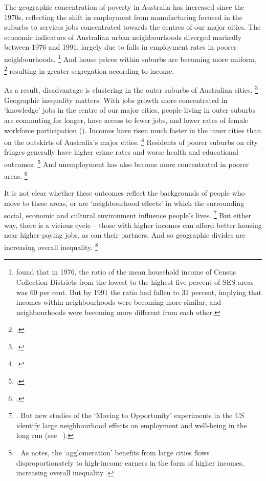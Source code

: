 The geographic concentration of poverty in Australia has increased since the 1970s, reflecting the shift in employment from manufacturing focused in the suburbs to services jobs concentrated towards the centres of our major cities.
The economic indicators of Australian urban neighbourhoods diverged markedly between 1976 and 1991, largely due to falls in employment rates in poorer neighbourhoods.%
    \footnote{\textcite{Gregory-Hunter-1995-spatial-disadvantage} found that in 1976, the ratio of the mean household income of Census Collection Districts from the lowest to the highest five percent of SES areas was 60 per cent.
    But by 1991 the ratio had fallen to 31 percent, implying that incomes within neighbourhoods were becoming more similar, and neighbourhoods were becoming more different from each other.}
And house prices within suburbs are becoming more uniform,%
	\footcite[][34, 18]{KellyHarrisonHunterEtAl2013}
resulting in greater segregation according to income.

As a result, disadvantage is clustering in the outer suburbs of Australian cities.%
	\footcites{Ryan-Selim-2017-theConvo-Liveable-Sydney-has-clear-winners-and-losers}{Pawson-et-al-2015-Addressing}{Hulse-etal-2014-AHURI-Disadv-places-urban-Aust-analyse-poverty-house-prices}
Geographic inequality matters.
With jobs growth more concentrated in `knowledge' jobs in the centre of our major cities, people living in outer suburbs are commuting for longer, have access to fewer jobs, and lower rates of female workforce participation ().
Incomes have risen much faster in the inner cities than on the outskirts of Australia's major cities.%
	\footcite[][9--11]{DaleyWoodChivers2017RegPatterns}
Residents of poorer suburbs on city fringes generally have higher crime rates and worse health and educational outcomes.%
	\footcites[][34]{KellyHarrisonHunterEtAl2013}{Katz-etal-2000-Boston-randomized-mobility-experiment}{Glaeser-2007-Econ-Approach-to-cities}
And unemployment has also become more concentrated in poorer areas.%
	\footcites{Pawson-et-al-2015-Addressing}[][17]{DaleyWood2015FiscalChallenges}

It is not clear whether these outcomes reflect the backgrounds of people who move to these areas, or are `neighbourhood effects' in which the surrounding social, economic and cultural environment influence people's lives.%
	\footnote{\textcite[][34]{KellyHarrisonHunterEtAl2013}. But new studies of the `Moving to Opportunity' experiments in the US identify large neighbourhood effects on employment and well-being in the long run (see \eg~\textcite{Rothwell_2015_movingtoopportunity_brookings}).}
But either way, there is a vicious cycle -- those with higher incomes can afford better housing near higher-paying jobs, as can their partners. And so geographic divides are increasing overall inequality.%
	\footnote{\textcites{Bill-2005-Neighbourhood-ineq-small-area-interactions-influence-econ-outcomes}[][101--102]{FloodBaker2010}. As \textcite{Sarkar-2016-scaling-income-distr-Aust} notes, the `agglomeration' benefits from large cities flows disproportionately to high-income earners in the form of higher incomes, increasing overall inequality
	.}

